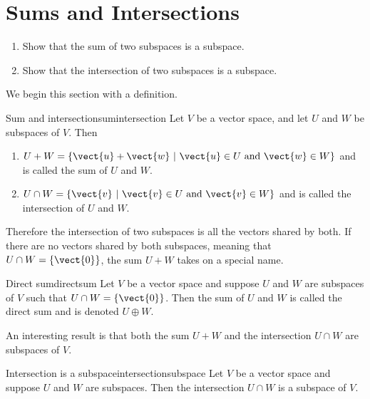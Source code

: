 \section{Sums and Intersections}

\begin{outcome}
\begin{enumerate}
\item[A.] Show that the sum of two subspaces is a subspace.

\item[B.] Show that the intersection of two subspaces is a subspace.
\end{enumerate}
\end{outcome}

We begin this section with a definition.

\begin{definition}{Sum and intersection}{sumintersection}
Let $V$ be a vector space, and let $U$ and $W$ be subspaces of
$V$.  
Then
\begin{enumerate}
\item $U+W = \{ \vect{u}+\vect{w} ~|~ \vect{u}\in U\mbox{ and } \vect{w}\in W\}$ and is 
called the sum of $U$ and $W$.

\item $U\cap W = \{ \vect{v} ~|~ \vect{v}\in U\mbox{ and } \vect{v}\in W\}$ and is 
called the intersection of $U$ and $W$.
\end{enumerate}
\end{definition}

Therefore the intersection of two subspaces is all the vectors shared by both. If there are no vectors shared by both subspaces, meaning that $U \cap W = \left\{ \vect{0} \right\}$, the sum $U+W$ takes on a special name.

\begin{definition}{Direct sum}{directsum}
Let $V$ be a vector space and suppose $U$ and $W$ are subspaces of $V$ such that  $U \cap W = \left\{ \vect{0} \right\}$. Then the sum of $U$ and $W$ is called the direct sum and is denoted $U \oplus W$. 
\end{definition}

An interesting result is that both the sum $U + W$ and the intersection $U \cap W$ are subspaces of $V$. 

\begin{example}{Intersection is a subspace}{intersectionsubspace}
Let $V$ be a vector space and suppose $U$ and $W$ are subspaces. Then the intersection $U \cap W$ is a subspace of $V$.
\end{example}

